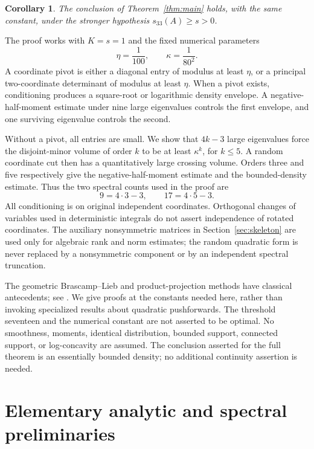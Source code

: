 \documentclass[11pt]{article}
\numberwithin{equation}{section}
\newtheorem{corollary}[theorem]{Corollary}
\theoremstyle{definition}\newtheorem{definition}[theorem]{Definition}
\theoremstyle{remark}\newtheorem{remark}[theorem]{Remark}
\newcommand{\1}{\mathbf 1}\newcommand{\diag}{\operatorname{diag}}
\begin{document}
\begin{corollary}\label{cor:33}
The conclusion of Theorem~\ref{thm:main} holds, with the same constant, under the stronger hypothesis $s_{33}(A)\ge s>0$.
\end{corollary}

The proof works with $K=s=1$ and the fixed numerical parameters
\begin{equation}\label{eq:parameters}
 \eta=\frac1{100},\qquad \kappa=\frac1{80^2}.
\end{equation}
A coordinate pivot is either a diagonal entry of modulus at least $\eta$, or a principal two-coordinate determinant of modulus at least $\eta$. When a pivot exists, conditioning produces a square-root or logarithmic density envelope. A negative-half-moment estimate under nine large eigenvalues controls the first envelope, and one surviving eigenvalue controls the second.

Without a pivot, all entries are small. We show that $4k-3$ large eigenvalues force the disjoint-minor volume of order $k$ to be at least $\kappa^k$, for $k\le5$. A random coordinate cut then has a quantitatively large crossing volume. Orders three and five respectively give the negative-half-moment estimate and the bounded-density estimate. Thus the two spectral counts used in the proof are
\[
 9=4\cdot3-3,\qquad 17=4\cdot5-3.
\]
All conditioning is on original independent coordinates. Orthogonal changes of variables used in deterministic integrals do not assert independence of rotated coordinates. The auxiliary nonsymmetric matrices in Section~\ref{sec:skeleton} are used only for algebraic rank and norm estimates; the random quadratic form is never replaced by a nonsymmetric component or by an independent spectral truncation.

The geometric Brascamp--Lieb and product-projection methods have classical antecedents; see \cite{BCCT,RV}. We give proofs at the constants needed here, rather than invoking specialized results about quadratic pushforwards. The threshold seventeen and the numerical constant are not asserted to be optimal. No smoothness, moments, identical distribution, bounded support, connected support, or log-concavity are assumed. The conclusion asserted for the full theorem is an essentially bounded density; no additional continuity assertion is needed.

\section{Elementary analytic and spectral preliminaries}
\end{document}
